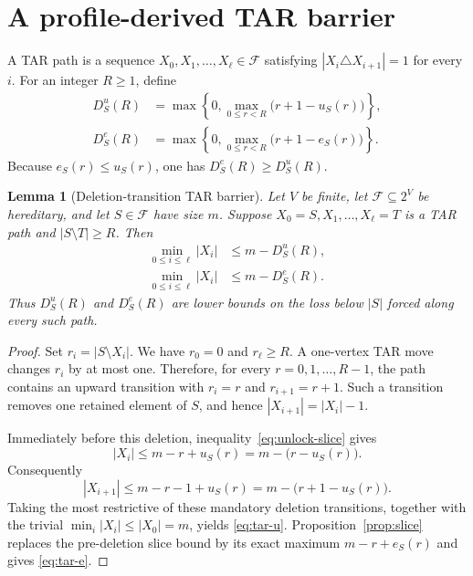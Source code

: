 \documentclass[11pt]{article}
\newtheorem{lemma}[theorem]{Lemma}
\theoremstyle{definition}
\theoremstyle{remark}
\newcommand{\F}{\mathcal{F}}
\begin{document}
\section{A profile-derived TAR barrier}
\label{sec:tar}

A TAR path is a sequence $X_0,X_1,\ldots,X_\ell\in\F$ satisfying
$|X_i\triangle X_{i+1}|=1$ for every $i$.  For an integer $R\ge1$, define
\begin{equation}
\begin{aligned}
 D^u_S(R)&=\max\left\{0,\max_{0\le r<R}\bigl(r+1-u_S(r)\bigr)\right\},\\
 D^e_S(R)&=\max\left\{0,\max_{0\le r<R}\bigl(r+1-e_S(r)\bigr)\right\}.
\end{aligned}
\label{eq:barriers}
\end{equation}
Because $e_S(r)\le u_S(r)$, one has $D^e_S(R)\ge D^u_S(R)$.

\begin{lemma}[Deletion-transition TAR barrier]
\label{lem:tar}
Let $V$ be finite, let $\F\subseteq2^V$ be hereditary, and let
$S\in\F$ have size $m$.  Suppose
$X_0=S,X_1,\ldots,X_\ell=T$ is a TAR path and
$|S\setminus T|\ge R$.  Then
\begin{align}
 \min_{0\le i\le\ell}|X_i|
   &\le m-D^u_S(R), \label{eq:tar-u}\\
 \min_{0\le i\le\ell}|X_i|
   &\le m-D^e_S(R). \label{eq:tar-e}
\end{align}
Thus $D^u_S(R)$ and $D^e_S(R)$ are lower bounds on the loss below $|S|$
forced along every such path.
\end{lemma}

\begin{proof}
Set $r_i=|S\setminus X_i|$.  We have $r_0=0$ and $r_\ell\ge R$.
A one-vertex TAR move changes $r_i$ by at most one.  Therefore, for every
$r=0,1,\ldots,R-1$, the path contains an upward transition with
$r_i=r$ and $r_{i+1}=r+1$.  Such a transition removes one retained element of
$S$, and hence $|X_{i+1}|=|X_i|-1$.

Immediately before this deletion, inequality~\eqref{eq:unlock-slice} gives
\[
 |X_i|\le m-r+u_S(r)=m-\bigl(r-u_S(r)\bigr).
\]
Consequently
\[
 |X_{i+1}|\le m-r-1+u_S(r)
 =m-\bigl(r+1-u_S(r)\bigr).
\]
Taking the most restrictive of these mandatory deletion transitions, together
with the trivial $\min_i|X_i|\le|X_0|=m$, yields \eqref{eq:tar-u}.
Proposition~\ref{prop:slice} replaces the pre-deletion slice bound by its exact
maximum $m-r+e_S(r)$ and gives \eqref{eq:tar-e}.
\end{proof}
\end{document}

